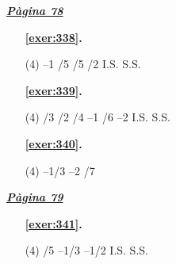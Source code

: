 \hyperlink{page.78}{\textbf{\em Pàgina 78}}
\begin{enumerate}



 \item[\fontfamily{phv}\selectfont\color{blue}\textbf{\ref{exer:338}. }] \label{ans:338}
 \begin{tasks}[column-sep=1em, item-indent=1.3333em](4)
	 \task --1
	 /5
	 /5
	 /2
	 \task I.S.
	 \task S.S.
\end{tasks}
 \end{enumerate}
\begin{enumerate}



 \item[\fontfamily{phv}\selectfont\color{blue}\textbf{\ref{exer:339}. }] \label{ans:339}
 \begin{tasks}[column-sep=1em, item-indent=1.3333em](4)
	 /3
	 /2
	 /4
	 \task --1
	 /6
	 \task --2
	 \task I.S.
	 \task S.S.
\end{tasks}



 \item[\fontfamily{phv}\selectfont\color{blue}\textbf{\ref{exer:340}. }] \label{ans:340}
 \begin{tasks}[column-sep=1em, item-indent=1.3333em](4)
	 \task --1/3
	 \task --2
	 /7
\end{tasks}
 \end{enumerate}
\vspace{0.3cm}


\hyperlink{page.79}{\textbf{\em Pàgina 79}}
\begin{enumerate}



 \item[\fontfamily{phv}\selectfont\color{blue}\textbf{\ref{exer:341}. }] \label{ans:341}
 \begin{tasks}[column-sep=1em, item-indent=1.3333em](4)
	 /5
	 \task --1/3
	 \task --1/2
	 \task I.S.
	 \task S.S.
\end{tasks}
 \end{enumerate}
\vspace{0.3cm}

